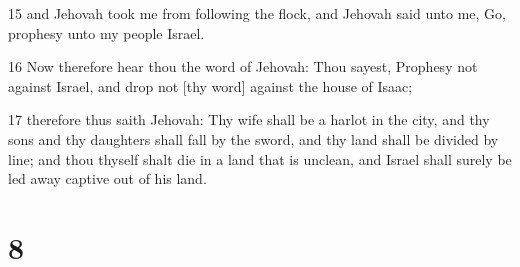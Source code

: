 \par 15 and Jehovah took me from following the flock, and Jehovah said unto me, Go, prophesy unto my people Israel.
\par 16 Now therefore hear thou the word of Jehovah: Thou sayest, Prophesy not against Israel, and drop not [thy word] against the house of Isaac;
\par 17 therefore thus saith Jehovah: Thy wife shall be a harlot in the city, and thy sons and thy daughters shall fall by the sword, and thy land shall be divided by line; and thou thyself shalt die in a land that is unclean, and Israel shall surely be led away captive out of his land.

\chapter{8}

